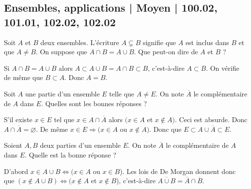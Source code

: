 \subsection{Ensembles, applications | Moyen | 100.02, 101.01, 102.02, 102.02}


\begin{question}

Soit $A$ et $B$ deux ensembles. L'écriture $A\varsubsetneq B$ signifie que $A$ est inclus dans $B$ et que $A\neq B$. On suppose que $A\cap B=A\cup B$. Que peut-on dire de $A$ et $B$ ?
\begin{answers}  
\end{answers}
\begin{explanations}
Si $A\cap B=A\cup B$ alors $A\subset A\cup B=A \cap B\subset B$, c'est-à-dire $A\subset B$. On vérifie de même que $B\subset A$. Donc $A=B$.
\end{explanations}
\end{question}


\begin{question}

Soit $A$ une partie d'un ensemble $E$ telle que $A\neq E$. On note $\overline{A}$ le complémentaire de $A$ dans $E$. Quelles sont les bonnes réponses ?
\begin{answers}  
\end{answers}
\begin{explanations}
S'il existe $x\in E$ tel que $x\in A\cap \overline{A}$ alors $(x\in A$ et $x\notin A)$. Ceci est absurde. Donc $A\cap \overline{A}=\varnothing$. De même $x\in E\Rightarrow (x\in A$ ou $x\notin A)$. Donc que $E\subset A\cup\overline{A}\subset E$.
\end{explanations}
\end{question}


\begin{question}

Soient $A,B$ deux parties d'un ensemble $E$. On note $\overline{A}$ le complémentaire de $A$ dans $E$. Quelle est la bonne réponse ?
\begin{answers}  
\end{answers}
\begin{explanations}
D'abord $x\in A\cup B \Leftrightarrow (x\in A$ ou $x\in B$). Les lois de De Morgan donnent donc que $(x\notin A\cup B)\Leftrightarrow (x\notin A$ et $x\notin B$), c'est-à-dire $\overline{A\cup B}=\overline{A}\cap \overline{B}$.
\end{explanations}
\end{question}


